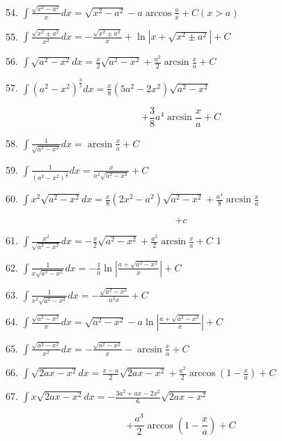 \documentclass[lang=cn,newtx,10pt,scheme=chinese]{elegantbook}
\begin{document}
54. \(\int \frac{\sqrt{{x}^{2} - {a}^{2}}}{x}{dx} = \sqrt{{x}^{2} - {a}^{2}} - a\arccos \frac{a}{x} + C\left( {x > a}\right)\)

55. \(\int \frac{\sqrt{{x}^{2} \pm {a}^{2}}}{{x}^{2}}{dx} = - \frac{\sqrt{{x}^{2} \pm {a}^{2}}}{x} + \ln \left| {x + \sqrt{{x}^{2} \pm {a}^{2}}}\right| + C\)

56. \(\int \sqrt{{a}^{2} - {x}^{2}}{dx} = \frac{x}{2}\sqrt{{a}^{2} - {x}^{2}} + \frac{{a}^{2}}{2}\arcsin \frac{x}{a} + C\)

57. \(\int {\left( {a}^{2} - {x}^{2}\right) }^{\frac{3}{2}}{dx} = \frac{x}{8}\left( {5{a}^{2} - 2{x}^{2}}\right) \sqrt{{a}^{2} - {x}^{2}}\)

\[
+ \frac{3}{8}{a}^{4}\arcsin \frac{x}{a} + C
\]

58. \(\int \frac{1}{\sqrt{{a}^{2} - {x}^{2}}}{dx} = \arcsin \frac{x}{a} + C\)

59. \(\int \frac{1}{{\left( {a}^{2} - {x}^{2}\right) }^{\frac{3}{2}}}{dx} = \frac{x}{{a}^{2}\sqrt{{a}^{2} - {x}^{2}}} + C\)

60. \(\int {x}^{2}\sqrt{{a}^{2} - {x}^{2}}{dx} = \frac{x}{8}\left( {2{x}^{2} - {a}^{2}}\right) \sqrt{{a}^{2} - {x}^{2}} + \frac{{a}^{4}}{8}\arcsin \frac{x}{a}\)

\[
+ c
\]

61. \(\int \frac{{x}^{2}}{\sqrt{{a}^{2} - {x}^{2}}}{dx} = - \frac{x}{2}\sqrt{{a}^{2} - {x}^{2}} + \frac{{a}^{2}}{2}\arcsin \frac{x}{a} + C\) 1

62. \(\int \frac{1}{x\sqrt{{a}^{2} - {x}^{2}}}{dx} = - \frac{1}{a}\ln \left| \frac{a + \sqrt{{a}^{2} - {x}^{2}}}{x}\right| + C\)

63. \(\int \frac{1}{{x}^{2}\sqrt{{a}^{2} - {x}^{2}}}{dx} = - \frac{\sqrt{{a}^{2} - {x}^{2}}}{{a}^{2}x} + C\)

64. \(\int \frac{\sqrt{{a}^{2} - {x}^{2}}}{x}{dx} = \sqrt{{a}^{2} - {x}^{2}} - a\ln \left| \frac{a + \sqrt{{a}^{2} - {x}^{2}}}{x}\right| + C\)

65. \(\int \frac{\sqrt{{a}^{2} - {x}^{2}}}{{x}^{2}}{dx} = - \frac{\sqrt{{a}^{2} - {x}^{2}}}{x} - \arcsin \frac{x}{a} + C\)

66. \(\int \sqrt{{2ax} - {x}^{2}}{dx} = \frac{x - a}{2}\sqrt{{2ax} - {x}^{2}} + \frac{{a}^{2}}{2}\arccos \left( {1 - \frac{x}{a}}\right) + C\)

67. \(\int x\sqrt{{2ax} - {x}^{2}}{dx} = - \frac{3{a}^{2} + {ax} - 2{x}^{2}}{6}\sqrt{{2ax} - {x}^{2}}\)

\[
+ \frac{{a}^{3}}{2}\arccos \left( {1 - \frac{x}{a}}\right) + C
\]
\end{document}
